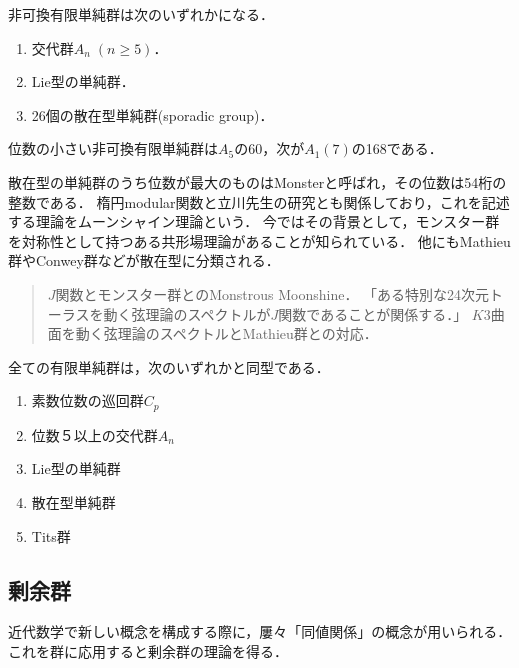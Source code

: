 \documentclass[uplatex,dvipdfmx]{jsreport}
\begin{document}
\begin{theorem}
    非可換有限単純群は次のいずれかになる．
    \begin{enumerate}
        \item 交代群$A_n\;(n\ge 5)$．
        \item Lie型の単純群．
        \item 26個の散在型単純群(sporadic group)．
    \end{enumerate}
\end{theorem}
\begin{remark}
    位数の小さい非可換有限単純群は$A_5$の60，次が$A_1(7)$の168である．

    散在型の単純群のうち位数が最大のものはMonsterと呼ばれ，その位数は54桁の整数である．
    楕円modular関数と立川先生の研究とも関係しており，これを記述する理論をムーンシャイン理論という．
    今ではその背景として，モンスター群を対称性として持つある共形場理論があることが知られている．
    他にもMathieu群やConwey群などが散在型に分類される．
    \begin{quote}
        $J$関数とモンスター群とのMonstrous Moonshine．
        「ある特別な24次元トーラスを動く弦理論のスペクトルが$J$関数であることが関係する．」
        $K3$曲面を動く弦理論のスペクトルとMathieu群との対応．
    \end{quote}
\end{remark}

\begin{theorem}
    全ての有限単純群は，次のいずれかと同型である．
    \begin{enumerate}
        \item 素数位数の巡回群$C_p$
        \item 位数５以上の交代群$A_n$
        \item Lie型の単純群
        \item 散在型単純群
        \item Tits群
    \end{enumerate}
\end{theorem}

\subsection{剰余群}

近代数学で新しい概念を構成する際に，屢々「同値関係」の概念が用いられる．
これを群に応用すると剰余群の理論を得る．
\end{document}

